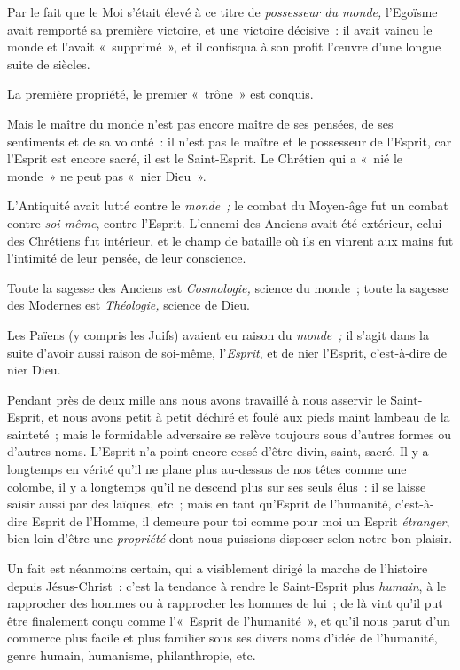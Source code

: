 \documentclass[french,twoside]{book} %
\begin{document}
Par le fait que le Moi s’était élevé à ce titre de \emph{possesseur du monde,} l’Egoïsme avait remporté sa première victoire, et une victoire décisive : il avait vaincu le monde et l’avait « supprimé », et il confisqua à son profit l’œuvre d’une longue suite de siècles.\par
La première propriété, le premier « trône » est conquis.\par
Mais le maître du monde n’est pas encore maître de ses pensées, de ses sentiments et de sa volonté : il n’est pas le maître et le possesseur de l’Esprit, car l’Esprit est encore sacré, il est le Saint-Esprit. Le Chrétien qui a « nié le monde » ne peut pas « nier Dieu ».\par
L’Antiquité avait lutté contre le \emph{monde ;} le combat du Moyen-âge fut un combat contre \emph{soi-même}, contre l’Esprit. L’ennemi des Anciens avait été extérieur, celui des Chrétiens fut intérieur, et le champ de bataille où ils en vinrent aux mains fut l’intimité de leur pensée, de leur conscience.\par
Toute la sagesse des Anciens est \emph{Cosmologie,} science du monde ; toute la sagesse des Modernes est \emph{Théologie,} science de Dieu.\par
Les Païens (y compris les Juifs) avaient eu raison du \emph{monde ;} il s’agit dans la suite d’avoir aussi raison de soi-même, l’\emph{Esprit}, et de nier l’Esprit, c’est-à-dire de nier Dieu.\par
Pendant près de deux mille ans nous avons travaillé à nous asservir le Saint-Esprit, et nous avons petit à petit déchiré et foulé aux pieds maint lambeau  de la sainteté ; mais le formidable adversaire se relève toujours sous d’autres formes ou d’autres noms. L’Esprit n’a point encore cessé d’être divin, saint, sacré. Il y a longtemps en vérité qu’il ne plane plus au-dessus de nos têtes comme une colombe, il y a longtemps qu’il ne descend plus sur ses seuls élus : il se laisse saisir aussi par des laïques, etc ; mais en tant qu’Esprit de l’humanité, c’est-à-dire Esprit de l’Homme, il demeure pour toi comme pour moi un Esprit \emph{étranger}, bien loin d’être une \emph{propriété} dont nous puissions disposer selon notre bon plaisir.\par
Un fait est néanmoins certain, qui a visiblement dirigé la marche de l’histoire depuis Jésus-Christ : c’est la tendance à rendre le Saint-Esprit plus \emph{humain}, à le rapprocher des hommes ou à rapprocher les hommes de lui ; de là vint qu’il put être finalement conçu comme l’« Esprit de l’humanité », et qu’il nous parut d’un commerce plus facile et plus familier sous ses divers noms d’idée de l’humanité, genre humain, humanisme, philanthropie, etc.\par
\end{document}

